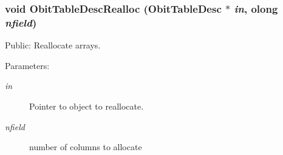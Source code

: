 \subsubsection{\setlength{\rightskip}{0pt plus 5cm}void Obit\-Table\-Desc\-Realloc ({\bf Obit\-Table\-Desc} $\ast$ {\em in}, {\bf olong} {\em nfield})}\label{ObitTableDesc_8h_a13}


Public: Reallocate arrays. 

\begin{Desc}
\item[Parameters:]
\begin{description}
\item[{\em in}]Pointer to object to reallocate. \item[{\em nfield}]number of columns to allocate \end{description}
\end{Desc}
